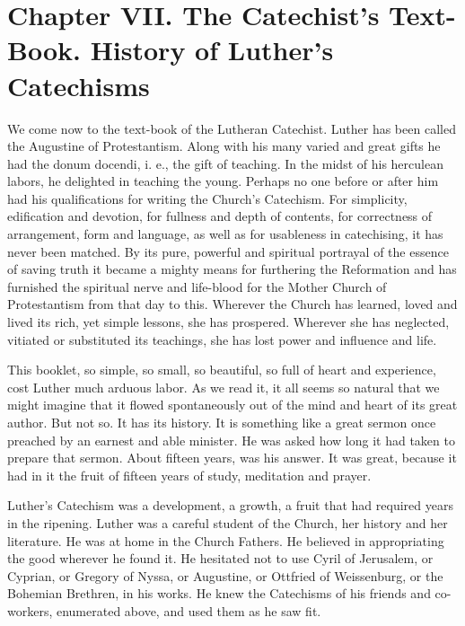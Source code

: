 \chapter[Chapter VII. History of Luther’s Catechisms]{Chapter VII. The Catechist’s Text-Book. History of Luther’s Catechisms}

We come now to the text-book of the Lutheran Catechist. Luther has been called the Augustine of Protestantism. Along with his many varied and great gifts he had the donum docendi, i. e., the gift of teaching. In the midst of his herculean labors, he delighted in teaching the young. Perhaps no one before or after him had his qualifications for writing the Church’s Catechism. For simplicity, edification and devotion, for fullness and depth of contents, for correctness of arrangement, form and language, as well as for usableness in catechising, it has never been matched.  By its pure, powerful and spiritual portrayal of the essence of saving truth it became a mighty means for furthering the Reformation and has furnished the spiritual nerve and life-blood for the Mother Church of Protestantism from that day to this. Wherever the Church has learned, loved and lived its rich, yet simple lessons, she has prospered. Wherever she has neglected, vitiated or substituted its teachings, she has lost power and influence and life.

This booklet, so simple, so small, so beautiful, so
full of heart and experience, cost Luther much arduous labor. As we read it, it all seems so natural that we might imagine that it flowed spontaneously out of the mind and heart of its great author. But not so. It has its history. It is something like a great sermon once preached by an earnest and able minister. He was asked how long it had taken to prepare that sermon. About fifteen years, was his answer. It was great, because it had in it the fruit of fifteen years of study, meditation and prayer.

Luther’s Catechism was a development, a growth, a fruit that had required years in the ripening.  Luther was a careful student of the Church, her history and her literature. He was at home in the Church Fathers. He believed in appropriating the good wherever he found it. He hesitated not to use Cyril of Jerusalem, or Cyprian, or Gregory of Nyssa, or Augustine, or Ottfried of Weissenburg, or the Bohemian Brethren, in his works. He knew the Catechisms of his friends and co-workers, enumerated above, and used them as he saw fit.

